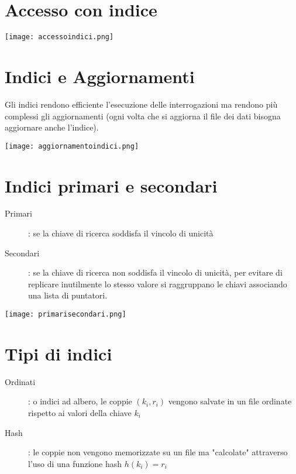 \documentclass[12pt]{article}
\begin{document}
\section{Accesso con indice}
\begin{center}
    \texttt{[image: accessoindici.png]}
\end{center}
\section{Indici e Aggiornamenti}
Gli indici rendono efficiente l'esecuzione delle interrogazioni ma rendono più complessi gli aggiornamenti (ogni volta che si aggiorna il file dei dati bisogna aggiornare anche l'indice).
\begin{center}
    \texttt{[image: aggiornamentoindici.png]}
\end{center}
\section{Indici primari e secondari}
\begin{description}
    \item[Primari]: se la chiave di ricerca soddisfa il vincolo di unicità
    \item[Secondari]: se la chiave di ricerca non soddisfa il vincolo di unicità, per evitare di replicare inutilmente lo stesso valore si raggruppano le chiavi associando una lista di puntatori.
\end{description}
\begin{center}
    \texttt{[image: primarisecondari.png]}
\end{center}
\section{Tipi di indici}
\begin{description}
    \item[Ordinati]: o indici ad albero, le coppie $(k_{i},r_{i})$ vengono salvate in un file ordinate rispetto ai valori della chiave $k_{i}$
    \item[Hash]: le coppie non vengono memorizzate su un file ma "calcolate" attraverso l'uso di una funzione hash $h(k_{i})=r_{i}$
\end{description}
\end{document}
